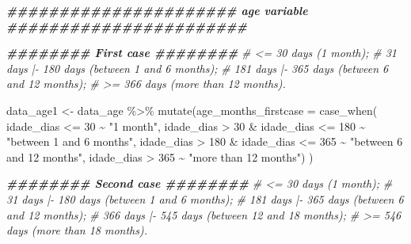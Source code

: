 \documentclass[
]{article}
\newenvironment{Shaded}{\begin{snugshade}}{\end{snugshade}}
\newcommand{\AttributeTok}[1]{\textcolor[rgb]{0.77,0.63,0.00}{#1}}
\newcommand{\CommentTok}[1]{\textcolor[rgb]{0.56,0.35,0.01}{\textit{#1}}}
\newcommand{\DecValTok}[1]{\textcolor[rgb]{0.00,0.00,0.81}{#1}}
\newcommand{\DocumentationTok}[1]{\textcolor[rgb]{0.56,0.35,0.01}{\textbf{\textit{#1}}}}
\newcommand{\FunctionTok}[1]{\textcolor[rgb]{0.00,0.00,0.00}{#1}}
\newcommand{\NormalTok}[1]{#1}
\newcommand{\OtherTok}[1]{\textcolor[rgb]{0.56,0.35,0.01}{#1}}
\newcommand{\SpecialCharTok}[1]{\textcolor[rgb]{0.00,0.00,0.00}{#1}}
\newcommand{\StringTok}[1]{\textcolor[rgb]{0.31,0.60,0.02}{#1}}
\renewenvironment{Shaded}{\begin{mdframed}[ backgroundcolor=shadecolor, linecolor = shadecolor, leftmargin=\dimexpr\leftmargin-2pt\relax, innerleftmargin=1.6pt, innertopmargin=5pt, skipabove=10pt,skipbelow=3pt ]}{\end{mdframed}}
\begin{document}
\begin{Shaded}
\begin{Highlighting}[]
\DocumentationTok{\#\#\#\#\#\#\#\#\#\#\#\#\#\#\#\#\#\#\#\#\#\# age variable \#\#\#\#\#\#\#\#\#\#\#\#\#\#\#\#\#\#\#\#\#\#\#}

\DocumentationTok{\#\#\#\#\#\#\#\# First case \#\#\#\#\#\#\#\#}
\CommentTok{\# \textless{}= 30 days (1 month);}
\CommentTok{\# 31 days |{-} 180 days (between 1 and 6 months); }
\CommentTok{\# 181 days |{-} 365 days (between 6 and 12 months); }
\CommentTok{\# \textgreater{}= 366 days (more than 12 months).}

\NormalTok{data\_age1 }\OtherTok{\textless{}{-}}\NormalTok{ data\_age }\SpecialCharTok{\%\textgreater{}\%}
  \FunctionTok{mutate}\NormalTok{(}\AttributeTok{age\_months\_firstcase =} \FunctionTok{case\_when}\NormalTok{(}
\NormalTok{    idade\_dias }\SpecialCharTok{\textless{}=} \DecValTok{30} \SpecialCharTok{\textasciitilde{}} \StringTok{"1 month"}\NormalTok{,}
\NormalTok{    idade\_dias }\SpecialCharTok{\textgreater{}} \DecValTok{30} \SpecialCharTok{\&}\NormalTok{ idade\_dias }\SpecialCharTok{\textless{}=} \DecValTok{180} \SpecialCharTok{\textasciitilde{}} \StringTok{"between 1 and 6 months"}\NormalTok{,}
\NormalTok{    idade\_dias }\SpecialCharTok{\textgreater{}} \DecValTok{180} \SpecialCharTok{\&}\NormalTok{ idade\_dias }\SpecialCharTok{\textless{}=} \DecValTok{365} \SpecialCharTok{\textasciitilde{}} \StringTok{"between 6 and 12 months"}\NormalTok{,}
\NormalTok{    idade\_dias }\SpecialCharTok{\textgreater{}} \DecValTok{365} \SpecialCharTok{\textasciitilde{}} \StringTok{"more than 12 months"}\NormalTok{) }
\NormalTok{    )}

\DocumentationTok{\#\#\#\#\#\#\#\# Second case \#\#\#\#\#\#\#\#}
\CommentTok{\# \textless{}= 30 days (1 month); }
\CommentTok{\# 31 days |{-} 180 days (between 1 and 6 months); }
\CommentTok{\# 181 days |{-} 365 days (between 6 and 12 months); }
\CommentTok{\# 366 days |{-} 545 days (between 12 and 18 months);}
\CommentTok{\# \textgreater{}= 546 days (more than 18 months).}


\end{Highlighting}
\end{Shaded}
\end{document}
